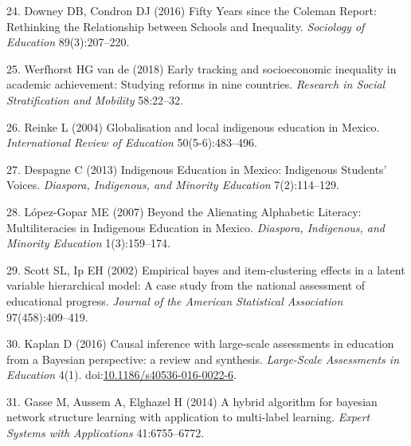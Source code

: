 \documentclass[9pt,twocolumn,twoside,]{pnas-new}
\begin{document}
\leavevmode\hypertarget{ref-Downey2016}{}%
24. Downey DB, Condron DJ (2016) Fifty Years since the Coleman Report:
Rethinking the Relationship between Schools and Inequality.
\emph{Sociology of Education} 89(3):207--220.

\leavevmode\hypertarget{ref-VandeWerfhorst2018}{}%
25. Werfhorst HG van de (2018) Early tracking and socioeconomic
inequality in academic achievement: Studying reforms in nine countries.
\emph{Research in Social Stratification and Mobility} 58:22--32.

\leavevmode\hypertarget{ref-Reinke2004}{}%
26. Reinke L (2004) Globalisation and local indigenous education in
Mexico. \emph{International Review of Education} 50(5-6):483--496.

\leavevmode\hypertarget{ref-Despagne2013}{}%
27. Despagne C (2013) Indigenous Education in Mexico: Indigenous
Students' Voices. \emph{Diaspora, Indigenous, and Minority Education}
7(2):114--129.

\leavevmode\hypertarget{ref-Lopez-Gopar2007}{}%
28. López-Gopar ME (2007) Beyond the Alienating Alphabetic Literacy:
Multiliteracies in Indigenous Education in Mexico. \emph{Diaspora,
Indigenous, and Minority Education} 1(3):159--174.

\leavevmode\hypertarget{ref-Scott2002}{}%
29. Scott SL, Ip EH (2002) Empirical bayes and item-clustering effects
in a latent variable hierarchical model: A case study from the national
assessment of educational progress. \emph{Journal of the American
Statistical Association} 97(458):409--419.

\leavevmode\hypertarget{ref-Kaplan2016}{}%
30. Kaplan D (2016) Causal inference with large-scale assessments in
education from a Bayesian perspective: a review and synthesis.
\emph{Large-Scale Assessments in Education} 4(1).
doi:\href{https://doi.org/10.1186/s40536-016-0022-6}{10.1186/s40536-016-0022-6}.

\leavevmode\hypertarget{ref-h2pc}{}%
31. Gasse M, Aussem A, Elghazel H (2014) A hybrid algorithm for bayesian
network structure learning with application to multi-label learning.
\emph{Expert Systems with Applications} 41:6755--6772.



% 
\end{document}
